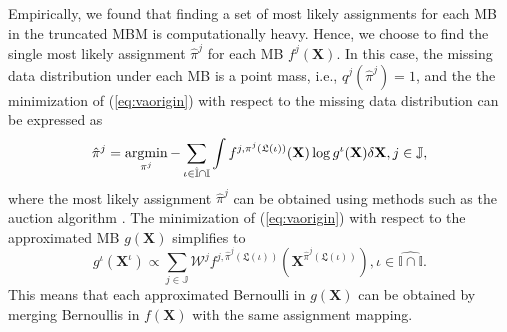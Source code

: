 \documentclass[journal]{IEEEtran}
\begin{document}
Empirically, we found that finding a set of most likely assignments for each MB in the truncated MBM is computationally heavy. Hence, we choose to find the single most likely assignment $\hat{\pi}^j$ for each MB $f^j(\mathbf{X})$. In this case, the missing data distribution under each MB is a point mass, i.e.,  $q^{j}(\hat{\pi}^{j})=1$, and the the minimization of (\ref{eq:vaorigin}) with respect to the missing data distribution can be expressed as
\begin{equation}
    \hat{\pi}^j = \operatornamewithlimits{argmin}_{\pi^j}-\sum_{\iota\in\hat{\mathbb{I}}\cap\mathbb{I}}\int f^{j,\pi^j(\mathfrak{L}(\iota))}(\mathbf{X})\log g^{\iota}(\mathbf{X})\delta \mathbf{X}, j\in\mathbb{J},
    \label{eq:estepoptimal}
\end{equation}
where the most likely assignment $\hat{\pi}^j$ can be obtained using methods such as the auction algorithm \cite{auction}. The minimization of (\ref{eq:vaorigin}) with respect to the approximated MB $g(\mathbf{X})$ simplifies to 
\begin{equation}
    g^{\iota}(\mathbf{X}^{\iota}) \propto \sum_{j\in\mathbb{J}}\mathcal{W}^jf^{j,\hat{\pi}^j(\mathfrak{L}(\iota))}(\mathbf{X}^{\hat{\pi}^j(\mathfrak{L}(\iota))}), \iota\in\hat{\mathbb{I}\cap\mathbb{I}}.
\label{eq:mstepop}
\end{equation}
This means that each approximated Bernoulli in $g(\mathbf{X})$ can be obtained by merging Bernoullis in $f(\mathbf{X})$ with the same assignment mapping. 


\end{document}
